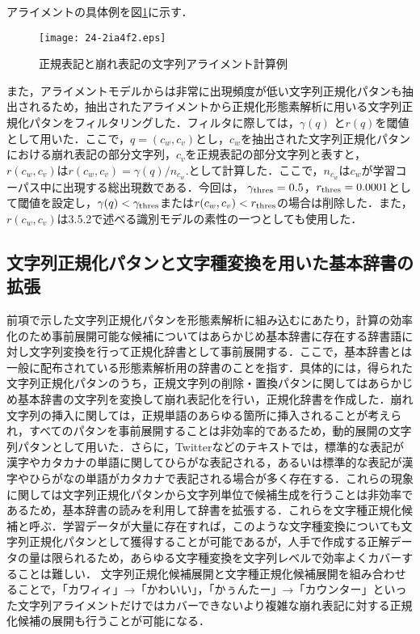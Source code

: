 \documentclass[japanese]{jnlp_1.4}
\begin{document}
アライメントの具体例を図\ref{fig:dpmatch}に示す．

\begin{figure}[t]
\begin{center}
\texttt{[image: 24-2ia4f2.eps]}
\end{center}
\caption{正規表記と崩れ表記の文字列アライメント計算例}
\label{fig:dpmatch}
\end{figure}

また，アライメントモデルからは非常に出現頻度が低い文字列正規化パタンも抽出されるため，抽出されたアライメントから正規化形態素解析に用いる文字列正規化パタンをフィルタリングした．フィルタに際しては，$\gamma(q)$ と$r(q)$を閾値として用いた．ここで，$q=(c_w, c_v)$とし，$c_w$を抽出された文字列正規化パタンにおける崩れ表記の部分文字列，$c_v$を正規表記の部分文字列と表すと，$r(c_w, c_v)$は$r(c_w, c_v)=\gamma(q)/n_{c_w}.$として計算した．ここで，$n_{c_w}$は$c_w$が学習コーパス中に出現する総出現数である．今回は， $\gamma_{\rm thres}= 0.5$，$r_{\rm thres}=0.0001$として閾値を設定し，$\gamma(q) < \gamma_{\rm thres}$または$r(c_w, c_v)<r_{\rm thres}$の場合は削除した．また，$r(c_w, c_v)$は3.5.2で述べる識別モデルの素性の一つとしても使用した．


\subsection{文字列正規化パタンと文字種変換を用いた基本辞書の拡張}

前項で示した文字列正規化パタンを形態素解析に組み込むにあたり，計算の効率化のため事前展開可能な候補についてはあらかじめ基本辞書に存在する辞書語に対し文字列変換を行って正規化辞書として事前展開する．ここで，基本辞書とは一般に配布されている形態素解析用の辞書のことを指す．具体的には，得られた文字列正規化パタンのうち，正規文字列の削除・置換パタンに関してはあらかじめ基本辞書の文字列を変換して崩れ表記化を行い，正規化辞書を作成した．崩れ文字列の挿入に関しては，正規単語のあらゆる箇所に挿入されることが考えられ，すべてのパタンを事前展開することは非効率的であるため，動的展開の文字列パタンとして用いた．さらに，Twitterなどのテキストでは，標準的な表記が漢字やカタカナの単語に関してひらがな表記される，あるいは標準的な表記が漢字やひらがなの単語がカタカナで表記される場合が多く存在する．これらの現象に関しては文字列正規化パタンから文字列単位で候補生成を行うことは非効率であるため，基本辞書の読みを利用して辞書を拡張する．これらを文字種正規化候補と呼ぶ．学習データが大量に存在すれば，このような文字種変換についても文字列正規化パタンとして獲得することが可能であるが，人手で作成する正解データの量は限られるため，あらゆる文字種変換を文字列レベルで効率よくカバーすることは難しい． 文字列正規化候補展開と文字種正規化候補展開を組み合わせることで，「カワィィ」→「かわいい」，「かぅんたー」→「カウンター」といった文字列アライメントだけではカバーできないより複雑な崩れ表記に対する正規化候補の展開も行うことが可能になる．
\end{document}
